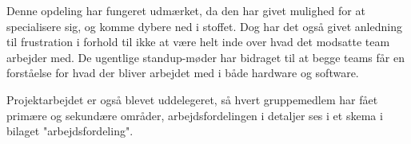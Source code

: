 Denne opdeling har fungeret udmærket, da den har givet mulighed for at specialisere sig, og komme dybere ned i stoffet. Dog har det også givet anledning til frustration i forhold til ikke at være helt inde over hvad det modsatte team arbejder med. De ugentlige standup-møder har bidraget til at begge teams får en forståelse for hvad der bliver arbejdet med i både hardware og software.

Projektarbejdet er også blevet uddelegeret, så hvert gruppemedlem har fået primære og sekundære områder, arbejdsfordelingen i detaljer ses i et skema i bilaget "arbejdsfordeling".

















